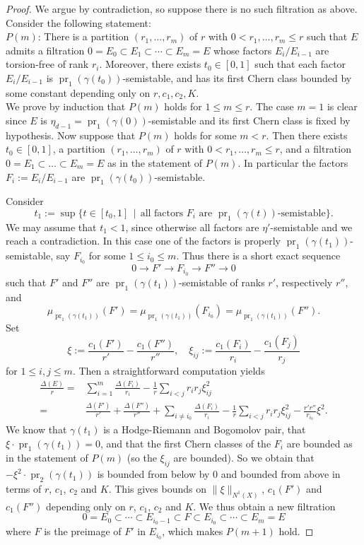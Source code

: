 \documentclass[10pt,a4paper]{amsart}
\DeclareMathOperator{\pr}{pr}
\begin{document}
\begin{proof}
We argue by contradiction, so suppose there is no such filtration as above. Consider the following statement:\\

$P(m)$: There is a partition $(r_1,\ldots,r_m)$ of $r$ with $0 < r_1, \ldots, r_m \le r$ such that $E$ admits a filtration $0 = E_0 \subset E_1 \subset \cdots \subset E_m =E$ whose factors $E_i/E_{i-1}$ are torsion-free of rank $r_i$. Moreover, there exists $t_0 \in [0,1]$ such that each factor $E_i/E_{i-1}$ is $\pr_1(\gamma(t_0))$-semistable, and has its first Chern class bounded by some constant depending only on $r, c_1, c_2, K$.\\

We prove by induction that $P(m)$ holds for $1 \le m \le r$. The case $m = 1$ is clear since $E$ is $\eta_{d-1} = \pr_1(\gamma(0))$-semistable and its first Chern class is fixed by hypothesis. Now suppose that $P(m)$ holds for some $m< r$. Then there exists $t_0 \in [0,1]$, a partition $(r_1,\ldots,r_m)$ of $r$ with $0 < r_1, \ldots, r_m \le r$, and a filtration $0 = E_1 \subset \ldots \subset E_m =E$ as in the statement of $P(m)$. In particular the factors $F_i := E_i/E_{i-1}$ are $\pr_1(\gamma(t_0))$-semistable. 

Consider
\[
    t_1 := \sup \{ t \in [t_0,1] \, \mid \, \text{all factors $F_i$ are $\pr_1(\gamma(t))$-semistable} \}.
\]
We may assume that $t_1 < 1$, since otherwise all factors are $\eta'$-semistable and we reach a contradiction. In this case one of the factors is properly $\pr_1(\gamma(t_1))$-semistable, say $F_{i_0}$ for some $1 \le i_0 \le m$. Thus there is a short exact sequence
\[
    0 \to F' \to F_{i_0} \to F'' \to 0
\]
such that $F'$ and $F''$ are $\pr_1(\gamma(t_1))$-semistable of ranks $r'$, respectively $r''$, and $$\mu_{\pr_1(\gamma(t_1))}(F') = \mu_{\pr_1(\gamma(t_1))}(F_{i_0}) = \mu_{\pr_1(\gamma(t_1))}(F'').$$
Set
\[
    \xi := \frac{c_1(F')}{r'} - \frac{c_1(F'')}{r''}, \quad \xi_{ij} := \frac{c_1(F_i)}{r_i} - \frac{c_1(F_j)}{r_j}
\]
for $1 \le i,j \le m$. Then a straightforward computation yields
\begin{align*}
        \frac{\Delta(E)}{r} ={}& \sum_{i=1}^m \frac{\Delta(F_i)}{r_i} - \frac{1}{r} \sum_{i < j} r_i r_j \xi_{ij}^2 \\
        ={}& \frac{\Delta(F')}{r'} + \frac{\Delta(F'')}{r''} + \sum_{i \neq i_0} \frac{\Delta(F_i)}{r_i} - \frac{1}{r} \sum_{i < j} r_i r_j \xi_{ij}^2  - \frac{r'r''}{r_{i_0}} \xi^2.
\end{align*}
We know that $\gamma(t_1)$ is a Hodge-Riemann and Bogomolov pair, that $\xi \cdot \pr_1(\gamma(t_1)) = 0$, 
and that the first Chern classes of the $F_i$ are bounded as in the statement of $P(m)$ (so the $\xi_{ij}$ are bounded).  So we obtain that $
-\xi^2 \cdot \pr_2(\gamma(t_1))$ is bounded from below by $0$ and bounded from above in terms of $r$, $c_1$, $c_2$ and $K$. This gives bounds on $\|\xi\|_{N^1(X)}$, $c_1(F')$ and $c_1(F'')$ depending only on $r$, $c_1$, $c_2$ and $K$. We thus obtain a new filtration 
\[
    0 = E_0 \subset \cdots\subset E_{i_0-1} \subset F \subset E_{i_0} \subset \cdots \subset E_m = E
\]
where $F$ is the preimage of $F'$ in $E_{i_0}$, which makes $P(m+1)$ hold.


\end{proof}
\end{document}
